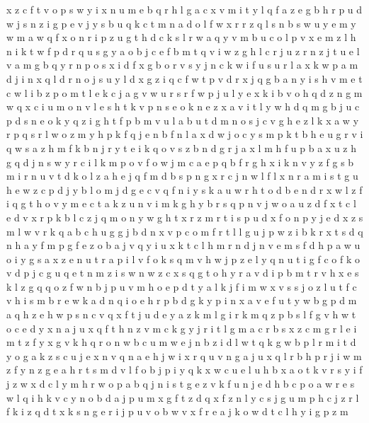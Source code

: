 \documentclass{article}
\begin{document}
x z
c f t v o p s w y i x n u m e b q r h l g a
c x v m i t y l q f a z e g b h r p u d w j s n
z i g p e v j y s b u q k c t m n a d o l f w x r
r z q l s
n
b s w u y e m
y
w
m a w q f x o n r i p z u g t h d c k s l
r w a q y v m b u c o l p
v x e m z l h n i k t w f p d r q u s g y a o b j c
e f b m t q v i w z g h l c r j u
z r n
z j t u e l v a m g b q y r n p o s x i d f
x g b o r v s y j n c k w i f u
s u r l a
x k w p a m d j i
n x q l d
r n o j s u y l d x g z i q c f w t p v
d r x j q g b a n y i s h v m e t c w l
i b z p o m t l e k c j a g v w u r
s r f w p j u l y e x k i b v o h q d z n g m
w q x c i u m o n v l e s h t k
v p n s e
o k n e z x a v i t l y w h d q m g b j u c p
d s n e o k y q z i g h t f p b m v u l a
b u t d m n o s j c v g h e z l k x a w y r p q
s r l w o z m y h p k f q j e n b
f n l a x d w j o c y s m p k t b h e u g r v i q
w s a z h m f k b n j r y
t e i k q o v s z b n d g r j a x l m h f u p
b a x u z h g q d j n s w y r c i l k m p o v f
o w j m c a e p q b f r g h x i k n v y z
f g s b m i r n u v t d k o l z a h e j q
f m d b s p n
g x r c j n w l
f l x n r a m i s t g u h e w z c p d j y b
l o m j d g e c v q f n i y s k a u w r h t
o d b
e n d r x w l z f i q g t h o v y
m e c t a k z u n v
i m k g h y b r s q p n v j w o a u z d f x t c l e
d v x r p k b l c z j q m o n y w g h t
x r z
m r t i s p u d x
f o n p y j e d x z s m l w v r k q a b c h u g
g j b d n x v p c o m f r t l
l g u j p w z i b k r x t s d q n h a y f m
p g f e z o b a j v q y i u x k t c l h m r n d
j
n v e m s f d h p a w u o i
y g s a x
z e n u t r a p i l v f o k s q m
v h w j p z e l y q n u t i g f c o
f k o v d p j c g u q e t n m z i s w
n w z c x s q g t o h y r a v d i p b m
t r v h x e s k l z g q
q
o z f w n b j p u v m
h o e p d t y a l k j f i m w x
v s
s j
o z l u t f c v h i s m b r e w k a d n q
i o e h r p b
d g k y p i n x a
v e f u t y w
b g p d m a q h z e
h w p s n c v q x f t j u d e y a z k m l g i r
k m q z p b s l f g v h w t o c e d y x n a j u
x q f t h n z v m c k g y j r i
t l g m a c r b s
x z c m g r
l e i m t z f y x g v k h q r o n w b c u
m w e
j n b z i d l w t q k g
w b p l r m i t d y o g a k z s c u j e x n v q
n a e h j w i x r q u
v n g a j u x q l r
b h p r j i w m z f y
n z g e a h r t s m d v l f o b j p i y q k x w c u
e l u h b x a o t k v r s y i f j z w
x d c l y m h r w o p a b q j n i s t g e z v k f u
n j e d h b c p o a w
r e s w l q i h k v c y n o b d a j p u m x g f t z
d q x f z n l y c s j g u m
p h c j z r l f k i
z q d t x k s n g e r i j p u v o b w
v x f r e a j k o w d t c l h y i g p z m
\end{document}
